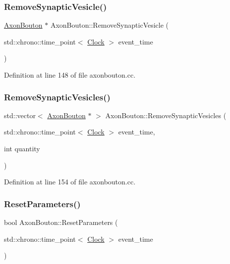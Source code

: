 \subsubsection{\texorpdfstring{Remove\+Synaptic\+Vesicle()}{RemoveSynapticVesicle()}}
{\footnotesize\ttfamily \mbox{\hyperlink{class_axon_bouton}{Axon\+Bouton}} $\ast$ Axon\+Bouton\+::\+Remove\+Synaptic\+Vesicle (\begin{DoxyParamCaption}\item[{std\+::chrono\+::time\+\_\+point$<$ \mbox{\hyperlink{universe_8h_a0ef8d951d1ca5ab3cfaf7ab4c7a6fd80}{Clock}} $>$}]{event\+\_\+time }\end{DoxyParamCaption})}



Definition at line 148 of file axonbouton.\+cc.

\mbox{\label{class_axon_bouton_ae4119170ef72beaed3c8a0eb1d80ef14}} 
\subsubsection{\texorpdfstring{Remove\+Synaptic\+Vesicles()}{RemoveSynapticVesicles()}}
{\footnotesize\ttfamily std\+::vector$<$ \mbox{\hyperlink{class_axon_bouton}{Axon\+Bouton}} $\ast$ $>$ Axon\+Bouton\+::\+Remove\+Synaptic\+Vesicles (\begin{DoxyParamCaption}\item[{std\+::chrono\+::time\+\_\+point$<$ \mbox{\hyperlink{universe_8h_a0ef8d951d1ca5ab3cfaf7ab4c7a6fd80}{Clock}} $>$}]{event\+\_\+time,  }\item[{int}]{quantity }\end{DoxyParamCaption})}



Definition at line 154 of file axonbouton.\+cc.

\mbox{\label{class_axon_bouton_a73d3721361c4e1ce6b110ffe1b4a7a88}} 
\subsubsection{\texorpdfstring{Reset\+Parameters()}{ResetParameters()}}
{\footnotesize\ttfamily bool Axon\+Bouton\+::\+Reset\+Parameters (\begin{DoxyParamCaption}\item[{std\+::chrono\+::time\+\_\+point$<$ \mbox{\hyperlink{universe_8h_a0ef8d951d1ca5ab3cfaf7ab4c7a6fd80}{Clock}} $>$}]{event\+\_\+time }\end{DoxyParamCaption})}



